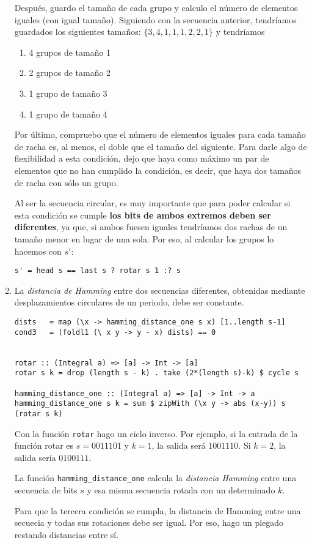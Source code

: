\documentclass[10pt,spanish]{article}
\begin{document}
\begin{enumerate}[1.]
Después, guardo el tamaño de cada grupo y calculo el número de elementos iguales (con igual tamaño). Siguiendo con la secuencia anterior, tendríamos guardados los siguientes tamaños: $\{3,4,1,1,1,2,2,1\}$ y tendríamos 

\begin{enumerate}[---]
    \item 4 grupos de tamaño 1
    \item 2 grupos de tamaño 2
    \item 1 grupo de tamaño 3
    \item 1 grupo de tamaño 4
\end{enumerate}

Por último, compruebo que el número de elementos iguales para cada tamaño de racha es, al menos, el doble que el tamaño del siguiente. Para darle algo de flexibilidad a esta condición, dejo que haya como máximo un par de elementos que no han cumplido la condición, es decir, que haya dos tamaños de racha con sólo un grupo.

Al ser la secuencia circular, es muy importante que para poder calcular si esta condición se cumple \textbf{\textcolor{azul}{los bits de ambos extremos deben ser diferentes}}, ya que, si ambos fuesen iguales tendríamos dos rachas de un tamaño menor en lugar de una sola. Por eso, al calcular los grupos lo hacemos con $s'$:

\begin{verbatim}
s' = head s == last s ? rotar s 1 :? s
\end{verbatim}

\item La \textit{\textcolor{azul}{distancia de Hamming}} entre dos secuencias diferentes, obtenidas mediante desplazamientos circulares de un periodo, debe ser constante.

\begin{verbatim}
dists   = map (\x -> hamming_distance_one s x) [1..length s-1]
cond3   = (foldl1 (\ x y -> y - x) dists) == 0


rotar :: (Integral a) => [a] -> Int -> [a]
rotar s k = drop (length s - k) . take (2*(length s)-k) $ cycle s

hamming_distance_one :: (Integral a) => [a] -> Int -> a
hamming_distance_one s k = sum $ zipWith (\x y -> abs (x-y)) s (rotar s k)

\end{verbatim}

Con la función \texttt{rotar} hago un ciclo inverso. Por ejemplo, si la entrada de la función rotar es $s=0011101$ y $k=1$, la salida será $1001110$. Si $k=2$, la salida sería $0100111$.

La función \texttt{hamming\_distance\_one} calcula la \textit{\textcolor{azul}{distancia Hamming}} entre una secuencia de bits $s$ y esa misma secuencia rotada con un determinado $k$.

Para que la tercera condición se cumpla, la distancia de Hamming entre una secuecia y todas sus rotaciones debe ser igual. Por eso, hago un plegado restando distancias entre sí.
\end{enumerate}
\end{document}
